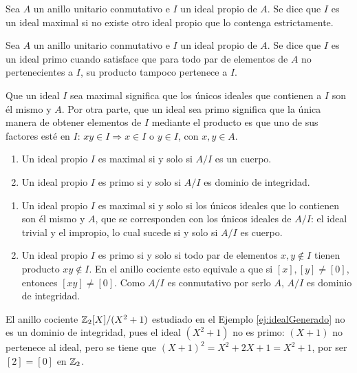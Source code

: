 \begin{deff}{\cite[p.~29]{GamboaAnillos}}
    Sea $A$ un anillo unitario conmutativo e $I$ un ideal propio de $A$. Se dice que $I$ es un ideal maximal si no existe otro ideal propio que lo contenga estrictamente. 
\end{deff}
    
\begin{deff}{\cite[p.~29]{GamboaAnillos}}
    Sea $A$ un anillo unitario conmutativo e $I$ un ideal propio de $A$. Se dice que $I$ es un ideal primo cuando satisface que para todo par de elementos de $A$ no pertenecientes a $I$, su producto tampoco pertenece a $I$.
\end{deff}

\begin{obs}
    Que un ideal $I$ sea maximal significa que los únicos ideales que contienen a $I$ son él mismo y $A$. Por otra parte, que un ideal sea primo significa que la única manera de obtener elementos de $I$ mediante el producto es que uno de sus factores esté en $I$: $xy \in I \Longrightarrow x\in I $ o $y \in I$, con $x,y\in A$.    
\end{obs}

\begin{prop}\leavevmode \vspace{-0.4\baselineskip}\label{prop:IdealmaximalCuerpo}
    \begin{enumerate}
        \item Un ideal propio $I$ es maximal si y solo si $A/I$ es un cuerpo.
        \item Un ideal propio $I$ es primo si y solo si $A/I$ es dominio de integridad.
    \end{enumerate}
\end{prop}

\begin{dem}{\cite[pp.~29-30]{GamboaAnillos}}
    \begin{enumerate}[label=\roman*)]
        \item Un ideal propio $I$ es maximal si y solo si los únicos ideales que lo contienen son él mismo y $A$, que se corresponden con los únicos ideales de $A/I$: el ideal trivial y el impropio, lo cual sucede si y solo si $A/I$ es cuerpo.
        \item Un ideal propio $I$ es primo si y solo si todo par de elementos $x,y\not\in I$ tienen producto $xy\not\in I$. En el anillo cociente esto equivale a que si $[x],[y] \neq [0]$, entonces $[xy] \neq [0]$. Como $A/I$ es conmutativo por serlo $A$, $A/I$ es dominio de integridad.
    \end{enumerate}
\end{dem}


    \begin{ejs}
        \item El anillo cociente $\mathbb{Z}_2[X]/(X^2+1)$ estudiado en el Ejemplo \ref{ej:idealGenerado} no es un dominio de integridad, pues el ideal $(X^2+1)$ no es primo: $(X+1)$ no pertenece al ideal, pero se tiene que $(X+1)^2 = X^2 + 2X + 1 = X^2 + 1$, por ser $[2] = [0]$ en $\mathbb{Z}_2$.
    \end{ejs}







